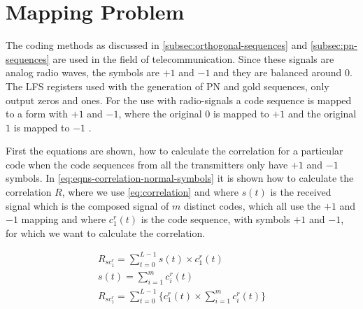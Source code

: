 
\section{Mapping Problem}
\label{sec:mapping-problem}

The coding methods as discussed in \autoref{subsec:orthogonal-sequences} and \autoref{subsec:pn-sequences} are used in the field of telecommunication.
Since these signals are analog radio waves, the symbols are $+1$ and $-1$ and they are balanced around $0$.
The LFS registers used with the generation of PN and gold sequences, only output zeros and ones.
For the use with radio-signals a code sequence is mapped to a form with $+1$ and $-1$, where the original $0$ is mapped to $+1$ and the original $1$ is mapped to $-1$ \cite{cdma-mapping-symbols-ref}.



First the equations are shown, how to calculate the correlation for a particular code when the code sequences from all the transmitters only have $+1$ and $-1$ symbols. In \autoref{eq:eqns-correlation-normal-symbols} it is shown how to calculate the correlation $R$, where we use \autoref{eq:correlation} and where $s(t)$ is the received signal which is the composed signal of $m$ distinct codes, which all use the $+1$ and $-1$ mapping and where $c^r_1(t)$ is the code sequence, with symbols $+1$ and $-1$, for which we want to calculate the correlation.


\begin{equation}
	\begin{array}{l}
		R_{sc^r_{1}} = \displaystyle\sum_{t = 0} ^ {L - 1} s(t) \times c^r_1(t)	 \\
		s(t) = \displaystyle\sum_{i = 1} ^ {m} c^r_i(t) \\
		R_{sc^r_{1}} = \displaystyle\sum_{t = 0} ^ {L - 1} \Bigg\{ c^r_1(t) \times  \displaystyle\sum_{i = 1} ^ {m} c^r_i(t) \Bigg\} 
	\end{array} 
	\label{eq:eqns-correlation-normal-symbols}
\end{equation}



